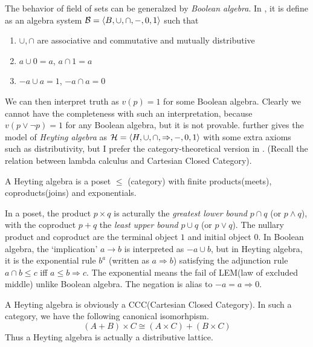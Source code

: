 The behavior of field of sets can be generalzed by {\it Boolean algebra}.
In \cite{Curry-Howard}, it is define as an algebra system 
$\mathcal{B}=\left<B,\cup,\cap,-,0,1\right>$ such that
\begin{enumerate}
    \item $\cup,\cap$ are associative and commutative and mutually distributive
    \item $a\cup 0=a$, $a\cap 1=a$
    \item $-a\cup a=1$, $-a\cap a=0$
\end{enumerate}
\newcommand{\Imply}{\Rightarrow}
We can then interpret truth as $v(p)=1$ for some Boolean algebra.
Clearly we cannot have the completeness with such an interpretation,
because $v(p\vee\neg p)=1$ for any Boolean algebra, but it is not provable.
\cite{Curry-Howard} further gives the model of {\it Heyting algebra} as
$\mathcal{H}=\angletuple{H,\cup,\cap,\Imply,-,0,1}$ with some extra
axioms such as distributivity, but I prefer the category-theoretical
version in \cite{cat-awodey}. (Recall the relation between lambda
calculus and Cartesian Closed Category). 

\begin{definition}
    A Heyting algebra is a poset $\le$ (category) with finite
    products(meets), coproducts(joins) and exponentials.
\end{definition}
\begin{remark}
    In a poset, the product $p\times q$ is acturally the 
    {\it greatest lower bound} $p\cap q$ (or $p\wedge q$), with the coproduct
    $p+q$ the {\it least upper bound} $p\cup q$ (or $p\vee q$).
    The nullary product and coproduct are the terminal object $1$
    and initial object $0$. In Boolean algebra, the `implication'
    $a\to b$ is interpreted as $-a\cup b$, but in Heyting algebra,
    it is the exponential rule $b^a$ (written as $a\Imply b$) satisfying
    the adjunction rule $a\cap b\le c$ iff $a\le b\Imply c$. The exponential
    means the fail of LEM(law of excluded middle) unlike Boolean algebra.
    The negation is alias to $-a=a\Imply 0$. 
\end{remark}
\begin{remark}
    A Heyting algebra is obviously a CCC(Cartesian Closed Category).
    In such a category, we have the following canonical isomorhpism.
    $$
        (A+B)\times C\cong(A\times C)+(B\times C)
    $$
    Thus a Heyting algebra is actually a distributive lattice.
\end{remark}

